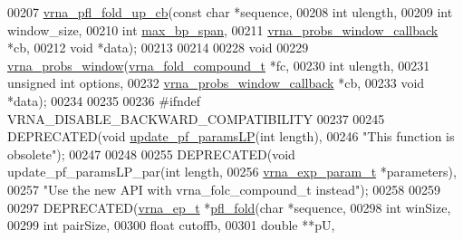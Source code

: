 \begin{DoxyCode}
00207 \hyperlink{group__local__pf__fold_ga8958d91b1f1aebfb32b58805d141ccf3}{vrna\_pfl\_fold\_up\_cb}(\textcolor{keyword}{const} \textcolor{keywordtype}{char}                  *sequence,
00208                     \textcolor{keywordtype}{int}                         ulength,
00209                     \textcolor{keywordtype}{int}                         window\_size,
00210                     \textcolor{keywordtype}{int}                         \hyperlink{group__model__details_ga18df869af0d70101106458fc3f027806}{max\_bp\_span},
00211                     \hyperlink{LPfold_8h_abe710a1182e6db69cc75329dfc9bed67}{vrna\_probs\_window\_callback}  *cb,
00212                     \textcolor{keywordtype}{void}                        *data);
00213 
00214 
00228 \textcolor{keywordtype}{void}
00229 \hyperlink{group__local__pf__fold_ga70ec33810fa17a9f67a7c59f156d0137}{vrna\_probs\_window}(\hyperlink{group__fold__compound_structvrna__fc__s}{vrna\_fold\_compound\_t}        *fc,
00230                   \textcolor{keywordtype}{int}                         ulength,
00231                   \textcolor{keywordtype}{unsigned} \textcolor{keywordtype}{int}                options,
00232                   \hyperlink{LPfold_8h_abe710a1182e6db69cc75329dfc9bed67}{vrna\_probs\_window\_callback}  *cb,
00233                   \textcolor{keywordtype}{void}                        *data);
00234 
00235 
00236 \textcolor{preprocessor}{#ifndef VRNA\_DISABLE\_BACKWARD\_COMPATIBILITY}
00237 
00245 DEPRECATED(\textcolor{keywordtype}{void} \hyperlink{group__local__pf__fold_ga5a019014d37fe6105131dfc2fc447880}{update\_pf\_paramsLP}(\textcolor{keywordtype}{int} length),
00246 \textcolor{stringliteral}{"This function is obsolete"});
00247 
00248 
00255 DEPRECATED(\textcolor{keywordtype}{void} update\_pf\_paramsLP\_par(\textcolor{keywordtype}{int}              length,
00256                                        \hyperlink{group__energy__parameters_structvrna__exp__param__s}{vrna\_exp\_param\_t} *parameters),
00257 \textcolor{stringliteral}{"Use the new API with vrna\_folc\_compound\_t instead"});
00258 
00259 
00297 DEPRECATED(\hyperlink{group__struct__utils_structvrna__elem__prob__s}{vrna\_ep\_t} *\hyperlink{group__local__pf__fold_ga7cdf690583871f9c158a0f91d4785cb6}{pfl\_fold}(\textcolor{keywordtype}{char}          *sequence,
00298                                \textcolor{keywordtype}{int}           winSize,
00299                                \textcolor{keywordtype}{int}           pairSize,
00300                                \textcolor{keywordtype}{float}         cutoffb,
00301                                \textcolor{keywordtype}{double}        **pU,

\end{DoxyCode}
